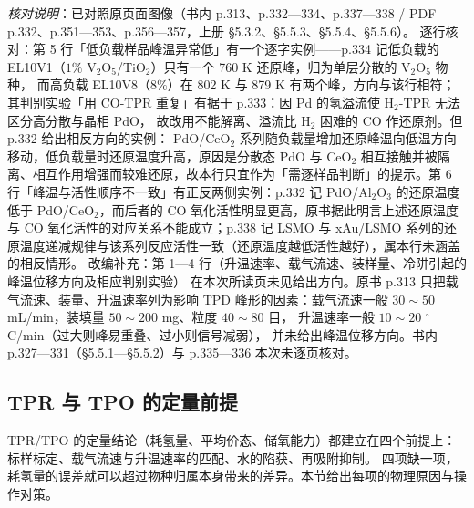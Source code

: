 \emph{核对说明}：已对照原页面图像（书内 p.313、p.332—334、p.337—338 / PDF
p.332、p.351—353、p.356—357，上册 §5.3.2、§5.5.3、§5.5.4、§5.5.6）。
逐行核对：第 5 行「低负载样品峰温异常低」有一个逐字实例——p.334 记低负载的 EL10V1（$1\%$
V$_2$O$_5$/TiO$_2$）只有一个 760 K 还原峰，归为单层分散的 V$_2$O$_5$ 物种，
而高负载 EL10V8（$8\%$）在 802 K 与 879 K 有两个峰，方向与该行相符；其判别实验「用
CO-TPR 重复」有据于 p.333：因 Pd 的氢溢流使 H$_2$-TPR 无法区分高分散与晶相 PdO，
故改用不能解离、溢流比 H$_2$ 困难的 CO 作还原剂。但 p.332 给出相反方向的实例：
PdO/CeO$_2$ 系列随负载量增加还原峰温向低温方向移动，低负载量时还原温度升高，原因是分散态 PdO 与
CeO$_2$ 相互接触并被隔离、相互作用增强而较难还原，故本行只宜作为「需逐样品判断」的提示。第 6
行「峰温与活性顺序不一致」有正反两侧实例：p.332 记 PdO/Al$_2$O$_3$ 的还原温度低于
PdO/CeO$_2$，而后者的 CO 氧化活性明显更高，原书据此明言上述还原温度与 CO
氧化活性的对应关系不能成立；p.338 记 LSMO 与 xAu/LSMO
系列的还原温度递减规律与该系列反应活性一致（还原温度越低活性越好），属本行未涵盖的相反情形。
改编补充：第 1—4 行（升温速率、载气流速、装样量、冷阱引起的峰温位移方向及相应判别实验）
在本次所读页未见给出方向。原书 p.313 只把载气流速、装量、升温速率列为影响 TPD 峰形的因素：载气流速一般
$30\sim50$ mL/min，装填量 $50\sim200$ mg、粒度 $40\sim80$ 目，
升温速率一般 $10\sim20$ $^{\circ}$C/min（过大则峰易重叠、过小则信号减弱），
并未给出峰温位移方向。书内 p.327—331（§5.5.1—§5.5.2）与 p.335—336 本次未逐页核对。


\subsection{TPR 与 TPO 的定量前提}
\label{sec:ch05b-quant}

\begin{probout}
TPR/TPO 的定量结论（耗氢量、平均价态、储氧能力）都建立在四个前提上：
标样标定、载气流速与升温速率的匹配、水的陷获、再吸附抑制。
四项缺一项，耗氢量的误差就可以超过物种归属本身带来的差异。本节给出每项的物理原因与操作对策。
\end{probout}

